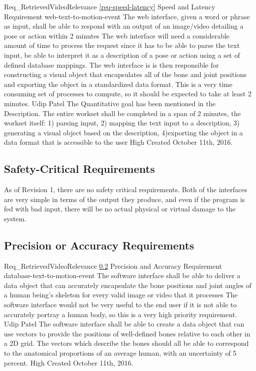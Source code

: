 \documentclass{scrreprt}
\begin{document}
\requirement
{Req_RetrievedVideoRelevance}
{\ref{req-speed-latency} Speed and Latency Requirement}
{web-text-to-motion-event}
{The web interface, given a word or phrase as input, shall be able to respond with an output of an image/video detailing a pose or action within 2 minutes}
{The web interface will need a considerable amount of time to process the request since it has to be able to parse the text input, be able to interpret it as a description of a pose or action using a set of defined database mappings. The web interface is is then responsible for constructing a visual object that encapsulates all of the bone and joint positions and exporting the object in a standardized data format. This is a very time consuming set of processes to compute, so it should be expected to take at least 2 minutes.}
{Udip Patel}
{The Quantitative goal has been mentioned in the Description. The entire workset shall be completed in a span of 2 minutes, the workset itself: 1) parsing input, 2) mapping the text input to a description, 3) generating a visual object based on the description, 4)exporting the object in a data format that is accessible to the user }
{High}
{Created October 11th, 2016.}

\subsection{Safety-Critical Requirements}
\label{req-safety-critical}
As of Revision 1, there are no safety critical requirements. Both of the interfaces are very simple in terms of the output they produce, and even if the program is fed with bad input, there will be no actual physical or virtual damage to the system.

\subsection{Precision or Accuracy Requirements}
\label{req-precision-accuracy}
\requirement
{Req_RetrievedVideoRelevance}
{\ref{req-precision-accuracy} Precision and Accuracy Requirement}
{database-text-to-motion-event}
{The software interface shall be able to deliver a data object that can accurately encapsulate the bone positions and joint angles of a human being's skeleton for every valid image or video that it processes}
{The software interface would not be very useful to the end user if it is not able to accurately portray a human body, so this is a very high priority requirement.}
{Udip Patel}
{The software interface shall be able to create a data object that can use vectors to provide the positions of well-defined bones relative to each other in a 2D grid. The vectors which describe the bones should all be able to correspond to the anatomical proportions of an average human, with an uncertainty of 5 percent.}
{High}
{Created October 11th, 2016.}
\\ \\
\end{document}
